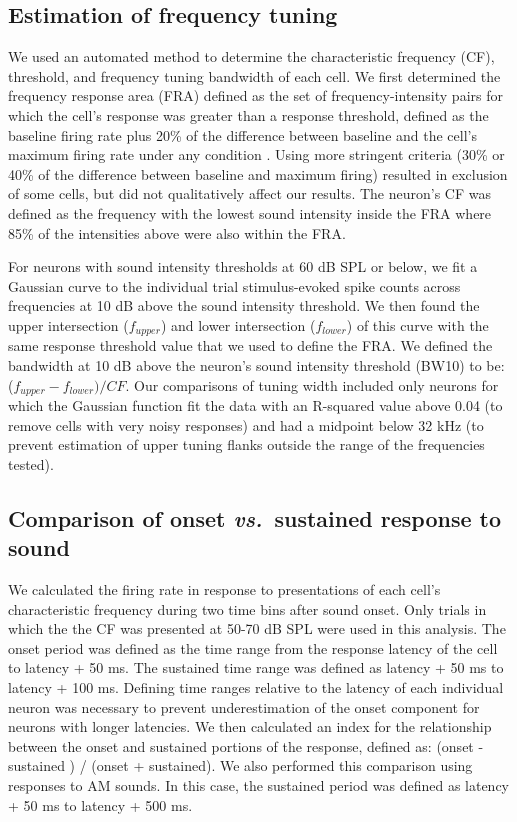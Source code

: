 \subsection{Estimation of frequency tuning}
%
We used an automated method to determine the characteristic frequency (CF), threshold, and frequency tuning bandwidth of each cell.
%
We first determined the frequency response area (FRA) defined as the set of frequency-intensity pairs for which the cell’s response was greater than a response threshold, defined as the baseline firing rate plus 20\% of the difference between baseline and the cell’s maximum firing rate under any condition \citep{Sutter1991, Schumacher2011}.
%
Using more stringent criteria (30\% or 40\% of the difference between baseline and maximum firing) resulted in exclusion of some cells, but did not qualitatively affect our results.
%
The neuron’s CF was defined as the frequency with the lowest sound intensity inside the FRA where 85\% of the intensities above were also within the FRA.

For neurons with sound intensity thresholds at 60 dB SPL or below, we fit a Gaussian curve to the individual trial stimulus-evoked spike counts across frequencies at 10 dB above the sound intensity threshold. 
%
We then found the upper intersection ($f_{upper}$) and lower intersection ($f_{lower}$) of this curve with the same response threshold value that we used to define the FRA. 
%
We defined the bandwidth at 10 dB above the neuron's sound intensity threshold (BW10) to be: ($f_{upper} - f_{lower})/CF$.
%
Our comparisons of tuning width included only neurons for which the Gaussian function fit the data with an R-squared value above 0.04 (to remove cells with very noisy responses) and had a midpoint below 32 kHz (to prevent estimation of upper tuning flanks outside the range of the frequencies tested). 

\subsection{Comparison of onset \emph{vs.}\ sustained response to sound}
We calculated the firing rate in response to presentations of each cell's characteristic frequency during two time bins after sound onset.
%
Only trials in which the the CF was presented at 50-70 dB SPL were used in this analysis.
%
The onset period was defined as the time range from the response latency of the cell to latency + 50 ms.
%
The sustained time range was defined as latency + 50 ms to latency + 100 ms.
%
Defining time ranges relative to the latency of each individual neuron was necessary to prevent underestimation of the onset component for neurons with longer latencies.
%
We then calculated an index for the relationship between the onset and sustained portions of the response, defined as: (onset - sustained ) / (onset + sustained). 
%
We also performed this comparison using responses to AM sounds.
%
In this case, the sustained period was defined as latency + 50 ms to latency + 500 ms.
%

